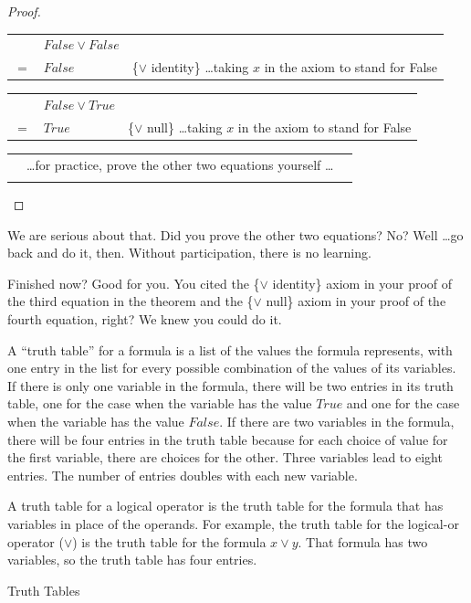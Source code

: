 \begin{proof}
\mbox{} \\
\begin{tabular}{llp{3.15in}}
    & $False \vee False$               & \\
$=$ & $False$                          & \{$\vee$ identity\} \dots taking $x$ in the axiom to stand for False \\
\end{tabular}

\begin{tabular}{llp{3.15in}}
    & $False \vee True$                & \\
$=$ & $True$                           & \{$\vee$ null\} \dots taking $x$ in the axiom to stand for False \\
\end{tabular}

\begin{tabular}{lll}
& \dots for practice, prove the other two equations yourself \dots & \\                              & \\
\end{tabular}

\end{proof}

We are serious about that. Did you prove the other two equations?
No? Well \dots go back and do it, then. Without participation, there
is no learning.

Finished now? Good for you. You cited the \{$\vee$ identity\} axiom in your
proof of the third equation in the theorem and the \{$\vee$ null\}
axiom in your proof of the fourth equation, right? We knew you could do it.

\begin{aside}
A ``truth table'' for a formula is a list of the values the formula represents,
with one entry in the list for every possible combination of the values of its variables.
If there is only one variable in the formula, there will be two entries in its truth table,
one for the case when the variable has the value $True$ and one for the case when the variable has the value $False$.
If there are two variables in the formula,
there will be four entries in the truth table because for each choice of value for the first variable,
there are choices for the other. Three variables lead to eight entries.
The number of entries doubles with each new variable.

A truth table for a logical operator is the truth table for the formula that has variables in place of the operands. For example, the truth table for the logical-or operator ($\vee$) is the truth table for the formula $x \vee y$. That formula has two variables, so the truth table has four entries.
\caption{Truth Tables}
\label{truth-tables}
\end{aside}

